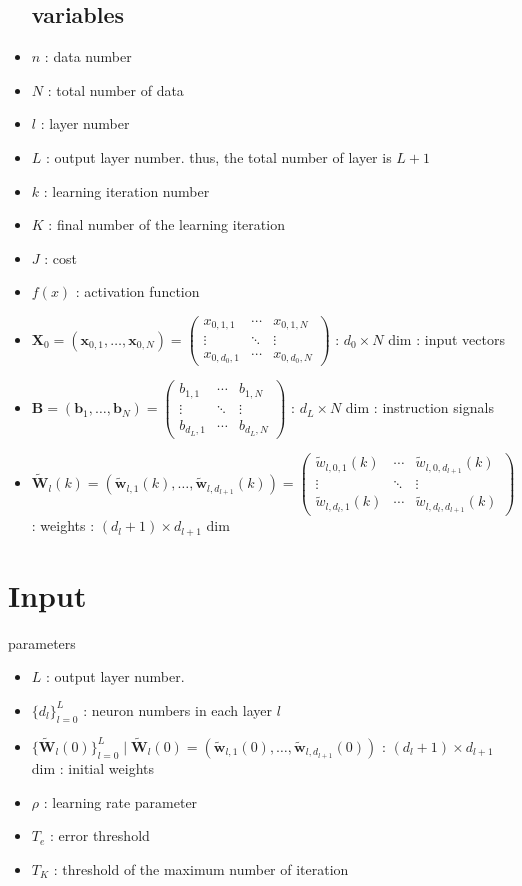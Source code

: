 \documentclass{article}
\begin{document}
\begin{itemize}
\subsection{variables}
\item $n$ : data number
\item $N$ : total number of data
\item $l$ : layer number
\item $L$ : output layer number. thus, the total number of layer is $L+1$
\item $k$ : learning iteration number
\item $K$ : final number of the learning iteration 
\item $J$ : cost
\item $f(x)$ : activation function
\item $\bm{X}_0 = (\bm{x}_{0,1},\dots , \bm{x}_{0,N}) = 
  \begin{pmatrix}
    x_{0,1,1} & \cdots & x_{0,1,N} \\
    \vdots & \ddots & \vdots\\
    x_{0,d_0,1} & \cdots & x_{0,d_0,N}
  \end{pmatrix}$
  : $d_0 \times N$ dim : input vectors
\item $\bm{B} = (\bm{b}_1,\dots , \bm{b}_N) =
  \begin{pmatrix}
    b_{1,1} & \cdots & b_{1,N}\\
    \vdots & \ddots & \vdots\\
    b_{d_L,1} & \cdots & b_{d_L,N}
  \end{pmatrix}
  $ : $d_L \times N$ dim : instruction signals
\item $\bm{\tilde{W}}_l(k) =
  (\bm{\tilde{w}}_{l,1}(k),\dots , \bm{\tilde{w}}_{l,d_{l+1}}(k)) = 
  \begin{pmatrix}
    \tilde{w}_{l,0,1}(k) & \cdots & \tilde{w}_{l,0,d_{l+1}}(k)\\
    \vdots & \ddots & \vdots\\
    \tilde{w}_{l,d_l,1}(k) & \cdots & \tilde{w}_{l,d_l,d_{l+1}}(k)
  \end{pmatrix}
  $ :
  weights : $(d_l+1) \times d_{l+1}$ dim 
\end{itemize}


\section{Input}
parameters
\begin{itemize}
\item $L$ : output layer number.
\item $\{ d_l \}_{l=0}^L$ : neuron numbers in each layer $l$
\item $\{\bm{\tilde{W}}_l(0)\}_{l=0}^L \mid \bm{\tilde{W}}_l(0) =
  (\bm{\tilde{w}}_{l,1}(0),\dots , \bm{\tilde{w}}_{l,d_{l+1}}(0))$ :
  $(d_l+1) \times d_{l+1}$ dim : initial weights
\item $\rho$ : learning rate parameter
\item $T_e$ : error threshold
\item $T_K$ : threshold of the maximum number of iteration
\end{itemize}
\end{document}
